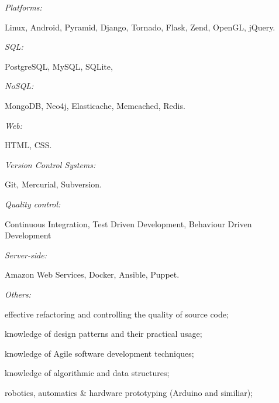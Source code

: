 \documentclass[10pt]{article}
\newenvironment{innerlist}[1][\enskip\textbullet]%
        {\begin{compactitem}[#1]}{\end{compactitem}}
\begin{document}
\textit{Platforms:}

\begin{innerlist}
\item[]
Linux, Android, Pyramid, Django, Tornado, Flask, Zend, OpenGL, jQuery.
\end{innerlist}

\textit{SQL:}
\begin{innerlist}
\item[]
PostgreSQL, MySQL, SQLite, 
\end{innerlist}
\vspace{0.02in}

\textit{NoSQL:}
\begin{innerlist}
\item[]
MongoDB, Neo4j, Elasticache, Memcached, Redis.
\end{innerlist}
\vspace{0.02in}

\textit{Web:}
\begin{innerlist}
\item[] HTML, CSS.
\end{innerlist}
\vspace{0.02in}

\textit{Version Control Systems:}
\begin{innerlist}
\item[] Git, Mercurial, Subversion.
\end{innerlist}
\vspace{0.02in}


\textit{Quality control:}
\begin{innerlist}
\item[] Continuous Integration, Test Driven Development, Behaviour Driven Development
\end{innerlist}
\vspace{0.02in}


\textit{Server-side:}
\begin{innerlist}
\item[] Amazon Web Services, Docker, Ansible, Puppet.
\end{innerlist}
\vspace{0.02in}



\vspace{0.2in}
\textit{Others:}
\begin{innerlist}
\item effective refactoring and controlling the quality of source code;
\item knowledge of design patterns and their practical usage;
\item knowledge of Agile software development techniques;
\item knowledge of algorithmic and data structures;
\item robotics, automatics \& hardware prototyping (Arduino and similiar);
\end{innerlist}
\end{document}

